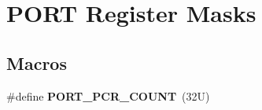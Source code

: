 \hypertarget{group___p_o_r_t___register___masks}{}\section{P\+O\+RT Register Masks}
\label{group___p_o_r_t___register___masks}
\subsection*{Macros}
\begin{DoxyCompactItemize}
\item 
\mbox{\label{group___p_o_r_t___register___masks_gae9d33dd352fbda70db758fa6daabf495}} 
\#define {\bfseries P\+O\+R\+T\+\_\+\+P\+C\+R\+\_\+\+C\+O\+U\+NT}~(32\+U)
\end{DoxyCompactItemize}
